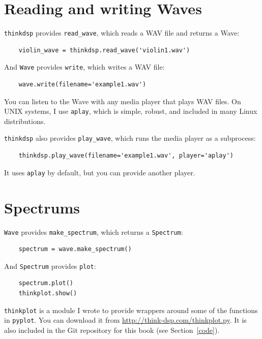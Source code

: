 \documentclass[12pt]{book}
\begin{document}
\section{Reading and writing Waves}

{\tt thinkdsp} provides \verb"read_wave", which reads a WAV
file and returns a Wave:

\begin{verbatim}
    violin_wave = thinkdsp.read_wave('violin1.wav')
\end{verbatim}

And {\tt Wave} provides {\tt write}, which writes a WAV file:

\begin{verbatim}
    wave.write(filename='example1.wav')
\end{verbatim}

You can listen to the Wave with any media player that plays WAV
files.  On UNIX systems, I use {\tt aplay}, which is simple, robust,
and included in many Linux distributions.

{\tt thinkdsp} also provides \verb"play_wave", which runs
the media player as a subprocess:

\begin{verbatim}
    thinkdsp.play_wave(filename='example1.wav', player='aplay')
\end{verbatim}

It uses {\tt aplay} by default, but you can provide another player.


\section{Spectrums}
\label{spectrums}

{\tt Wave} provides \verb"make_spectrum", which returns a
{\tt Spectrum}:

\begin{verbatim}
    spectrum = wave.make_spectrum()
\end{verbatim}

And {\tt Spectrum} provides {\tt plot}:

\begin{verbatim}
    spectrum.plot()
    thinkplot.show()
\end{verbatim}

{\tt thinkplot} is a module I wrote to provide wrappers around some of
the functions in {\tt pyplot}.  You can download it from
\url{http://think-dsp.com/thinkplot.py}.  It is also included in the
Git repository for this book (see Section~\ref{code}).
\end{document}
